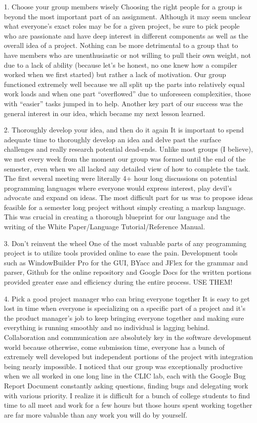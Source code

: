 \documentclass[12pt]{report}
\begin{document}
1.     	Choose your group members wisely
Choosing the right people for a group is beyond the most important part of an assignment. Although it may seem unclear what everyone’s exact roles may be for a given project, be sure to pick people who are passionate and have deep interest in different components as well as the overall idea of a project. Nothing can be more detrimental to a group that to have members who are unenthusiastic or not willing to pull their own weight, not due to a lack of ability (because let’s be honest, no one knew how a compiler worked when we first started) but rather a lack of motivation. Our group functioned extremely well because we all split up the parts into relatively equal work loads and when one part “overflowed” due to unforeseen complexities, those with “easier” tasks jumped in to help. Another key part of our success was the general interest in our idea, which became my next lesson learned.

2.     	Thoroughly develop your idea, and then do it again
It is important to spend adequate time to thoroughly develop an idea and delve past the surface challenges and really research potential dead-ends. Unlike most groups (I believe), we met every week from the moment our group was formed until the end of the semester, even when we all lacked any detailed view of how to complete the task. The first several meeting were literally 4+ hour long discussions on potential programming languages where everyone would express interest, play devil’s advocate and expand on ideas. The most difficult part for us was to propose ideas feasible for a semester long project without simply creating a markup language. This was crucial in creating a thorough blueprint for our language and the writing of the White Paper/Language Tutorial/Reference Manual.

3.     	Don’t reinvent the wheel
One of the most valuable parts of any programming project is to utilize tools provided online to ease the pain. Development tools such as WindowBuilder Pro for the GUI, BYacc and JFlex for the grammar and parser, Github for the online repository and Google Docs for the written portions provided greater ease and efficiency during the entire process. USE THEM!

4.     	Pick a good project manager who can bring everyone together
It is easy to get lost in time when everyone is specializing on a specific part of a project and it’s the product manager’s job to keep bringing everyone together and making sure everything is running smoothly and no individual is lagging behind. Collaboration and communication are absolutely key in the software development world because otherwise, come submission time, everyone has a bunch of extremely well developed but independent portions of the project with integration being nearly impossible. I noticed that our group was exceptionally productive when we all worked in one long line in the CLIC lab, each with the Google Bug Report Document constantly asking questions, finding bugs and delegating work with various priority. I realize it is difficult for a bunch of college students to find time to all meet and work for a few hours but those hours spent working together are far more valuable than any work you will do by yourself.
\end{document}
